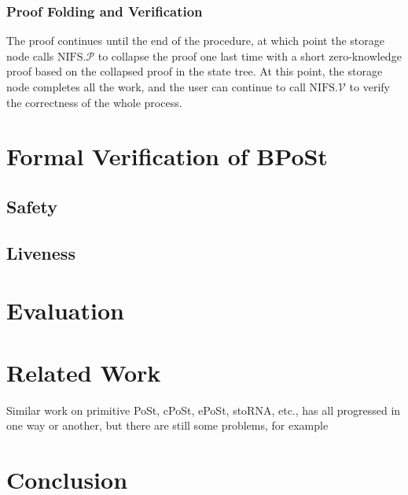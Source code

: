 \documentclass[journal]{IEEEtran}
\begin{document}
\subsubsection{Proof Folding and Verification}
The proof continues until the end of the procedure, at which point the storage node calls $\text{NIFS.}\mathcal{P}$ to collapse the proof one last time with a short zero-knowledge proof based on the collapsed proof in the state tree. At this point, the storage node completes all the work, and the user can continue to call $\text{NIFS.}\mathcal{V}$ to verify the correctness of the whole process.


\section{Formal Verification of BPoSt}
\label{sec:formal}

\subsection{Safety}


\subsection{Liveness}


\section{Evaluation}


\section{Related Work}

Similar work on primitive PoSt\cite{2019pospacetime}, cPoSt\cite{2020cpost}, ePoSt\cite{2023epost}, stoRNA\cite{2023storna}, etc., has all progressed in one way or another, but there are still some problems, for example


\section{Conclusion}

\nocite{*}


\end{document}

